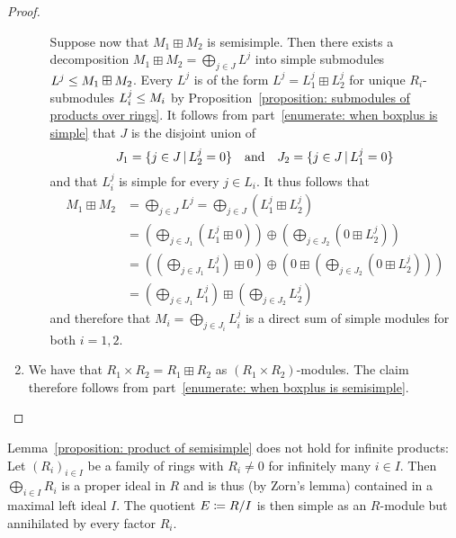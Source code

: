 \begin{proof}
\begin{enumerate}
\begin{itemize}
          Suppose now that $M_1 \boxplus M_2$ is semisimple.
          Then there exists a decomposition $M_1 \boxplus M_2 = \bigoplus_{j \in J} L^j$ into simple submodules $L^j \leq M_1 \boxplus M_2$.
          Every $L^j$ is of the form $L^j = L^j_1 \boxplus L^j_2$ for unique $R_i$-submodules $L^j_i \leq M_i$ by Proposition~\ref{proposition: submodules of products over rings}.
          It follows from part~\ref*{enumerate: when boxplus is simple} that $J$ is the disjoint union of
          \[
              J_1
            = \{ j \in J \suchthat L^j_2 = 0 \}
            \quad\text{and}\quad
              J_2
            = \{ j \in J \suchthat L^j_1 = 0 \}
          \]
          and that $L^j_i$ is simple for every $j \in L_i$.
          It thus follows that
          \begingroup
          \allowdisplaybreaks
          \begin{align*}
                M_1 \boxplus M_2
            &=  \bigoplus_{j \in J} L^j
            =   \bigoplus_{j \in J} ( L^j_1 \boxplus  L^j_2 )
            \\
            &=  \left(
                  \bigoplus_{j \in J_1} ( L^j_1 \boxplus 0 )
                \right)
                \oplus
                \left(
                  \bigoplus_{j \in J_2} ( 0 \boxplus  L^j_2 )
                \right)
            \\
            &=  \left(
                  \left( \bigoplus_{j \in J_1} L^j_1 \right) \boxplus 0
                \right)
                \oplus
                \left(
                  0 \boxplus \left( \bigoplus_{j \in J_2} ( 0 \boxplus  L^j_2 ) \right)
                \right)
            \\
            &=  \left( \bigoplus_{j \in J_1} L^j_1 \right)
                \boxplus
                \left( \bigoplus_{j \in J_2} L^j_2 \right)
          \end{align*}
          \endgroup
          and therefore that $M_i = \bigoplus_{j \in J_i} L^j_i$ is a direct sum of simple modules for both $i = 1,2$.
      \end{itemize}
    \item
      We have that $R_1 \times R_2 = R_1 \boxplus R_2$ as $(R_1 \times R_2)$-modules.
      The claim therefore follows from part~\ref*{enumerate: when boxplus is semisimple}.
    \qedhere
  \end{enumerate}
\end{proof}


\begin{remark}
  \label{remark: infinite products have new simple modules}
  Lemma~\ref{proposition: product of semisimple} does not hold for infinite products:
  Let $(R_i)_{i \in I}$ be a family of rings with $R_i \neq 0$ for infinitely many $i \in I$.
  Then $\bigoplus_{i \in I} R_i$ is a proper ideal in $R$ and is thus (by Zorn’s lemma) contained in a maximal left ideal $I$.
  The quotient $E \coloneqq R/I$ is then simple as an $R$-module but annihilated by every factor $R_i$.
\end{remark}


